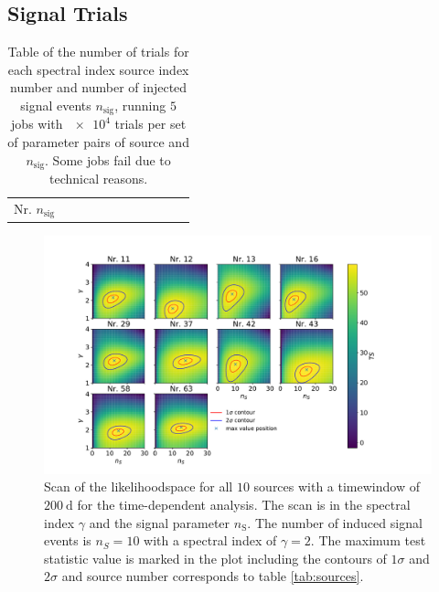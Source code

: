 \newpage
\subsection{Signal Trials}

\begin{table}
  \centering
  \caption{Table of the number of trials for each spectral index source index number and number of injected signal events $n_\text{sig}$, running $\num{5}$ jobs with $\num{e4}$ trials per set of parameter pairs of source and $n_\text{sig}$. Some jobs fail due to technical reasons.}
  \label{tab:trials_sig_time_dep_table}
  \begin{tabular}{>{\centering\arraybackslash}p{.9cm}|%
                    cccccccccc}
    \toprule
    \: Nr. \newline $n_\text{sig}$ \: & 
    \toprule
    
    \toprule
  \end{tabular}
\end{table}

\begin{figure}
    \centering
    \includegraphics[width=\linewidth]{Plots/appendix/llh_scan.pdf}
    \caption{Scan of the likelihoodspace for all $\num{10}$ sources with a timewindow of $\SI{200}{\day}$ for the time-dependent analysis. The scan is in the spectral index $\gamma$ and the signal parameter $n_\text{S}$. The number of induced signal events is $n_S = \num{10}$ with a spectral index of $\gamma = 2$. The maximum test statistic value is marked in the plot including the contours of $\num{1}\sigma$ and $\num{2}\sigma$ and source number corresponds to table \ref{tab:sources}.}
    \label{fig:llh_scan_time_dep_all}
\end{figure}

